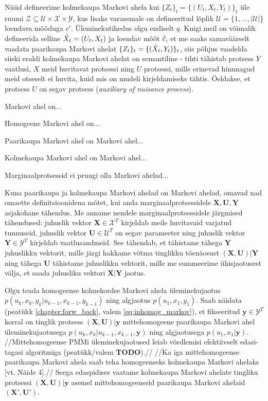 Nüüd defineerime kolmekaupa Markovi ahela kui $\{Z_t\}_{t} = \{(U_t,X_t,Y_t)\}_{t}$ üle ruumi $\mathcal{Z} \subseteq \mathcal{U} \times \mathcal{X} \times \mathcal{Y}$, kus lisaks varasemale on defineeritud lõplik $\mathcal{U} = \{1,\ldots,|\mathcal{U|}\}$ loendava mõõduga $c'$. Üleminekutihedus olgu endiselt $q$. Kuigi meil on võimalik defineerida selline $\Tilde{X}_t = (U_t,X_t)$ ja loendav mõõt $\Tilde{c}$, et me saaks samaväärselt vaadata paarikaupa Markovi ahelat $\{Z_t\}_{t} = \{(\Tilde{X}_t,Y_t)\}_{t}$, siis põhjus vaadelda siiski eraldi kolmekaupa Markovi ahelat on semantiline - tihti tähistab protsess $Y$ vaatlusi, $X$ meid huvitavat protsessi ning $U$ protsessi, mille erinevad hinnnagud meid otseselt ei huvita, kuid mis on mudeli kirjeldamiseks tähtis. Öeldakse, et protsess $U$ on segav protsess (\emph{auxiliary of nuisance process}).

\hline

Markovi ahel on...

Homogeene Markovi ahel on...

Paarikaupa Markovi ahel on Markovi ahel...

Kolmekaupa Markovi ahel on Markovi ahel...

Marginaalprotsessid ei pruugi olla Markovi ahelad...


Kuna paarikaupa ja kolmekaupa Markovi ahelad on Markovi ahelad, omavad nad omaette definitsioonidena mõtet, kui anda marginaalprotsessidele $\bm{X},\bm{U},\bm{Y}$ asjakohane tähendus. Me anname nendele marginaalprotsessidele järgmised tähendused: juhuslik vektor $\bm{X} \in \mathcal{X}^T$ kirjeldab meile huvitavaid varjatud tunnuseid, juhuslik vektor $\bm{U} \in \mathcal{U}^T$ on segav parameeter ning juhuslik vektor $\bm{Y} \in \mathcal{Y}^T$ kirjeldab vaatlusandmeid. See tähendab, et tähistame tähega $\bm{Y}$ juhuslikku vektorit, mille järgi hakkame võtma tinglikku tõenäosust $(\bm{X},\bm{U})|\bm{Y}$ ning tähega $\bm{U}$ tähistame juhuslikku vektorit, mille me summeerime ühisjaotusest välja, et saada juhusliku vektori $\bm{X}|\bm{Y}$ jaotus.





Olgu teada homogeense kolmekordse Markovi ahela üleminekujaotus $p(u_k, x_k, y_k | u_{k-1}, x_{k-1}, y_{k-1})$ ning algjaotus $p(u_1, x_1, y_1)$. Saab näidata (peatükk \ref{chapter:forw_back}, valem \ref{eq:inhomog_markov}), et fikseeritud $\bm{y}\in \mathcal{Y}^T$ korral on tinglik protsess $(\bm{X},\bm{U})|\bm{y}$ mittehomogeene paarikaupa Markovi ahel üleminekujaotusega $p(u_k, x_k | u_{k-1}, x_{k-1}, \bm{y})$ ning algjaotusega $p(u_1,x_1|\bm{y})$. //Mittehomogeense PMMi üleminekujaotused leiab võrdlemisi efektiivselt edasi-tagasi algoritmiga (peatükk/valem \textbf{TODO}).// //Ka iga mittehomogeense paarikaupa Markovi ahela saab teha homogeenseks kolmekaupa Markovi ahelaks [vt. \cite{Soop.2023} Näide 4].// Seega edaspidises vaatame kolmekaupa Markovi ahelate tingliku protsessi  $(\bm{X},\bm{U})|\bm{y}$ asemel mittehomogeenseid paarikaupa Markovi ahelaid $(\bm{X'},\bm{U'})$.



